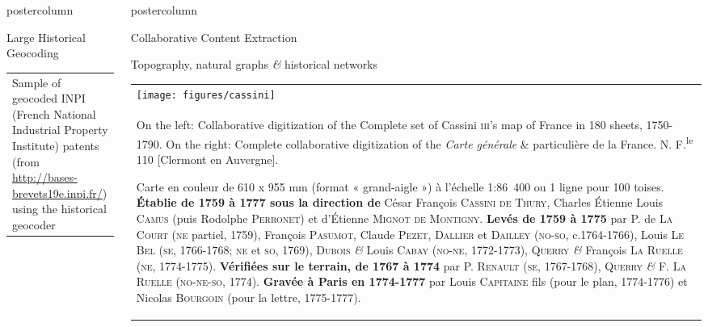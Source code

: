 \documentclass[final,hyperref={pdfpagelabels=false}]{beamer}
\let\oldcite=\cite
\renewcommand{\cite}[1]{\textcolor{ta3chameleon}{\oldcite{#1}}}
\begin{document}
\begin{frame}
\begin{columns}
\begin{column}{0.5\textwidth}
\begin{beamercolorbox}[center,wd=\textwidth]{postercolumn}
\begin{minipage}[t]{.98\textwidth}
\begin{block}{Large Historical Geocoding}
\begin{tabular}{>{\centering}m{}}
        \scriptsize Sample of geocoded INPI (French National Industrial Property Institute) patents (from \url{http://bases-brevets19e.inpi.fr/}) using the historical geocoder~\cite{Cura2018}
      \end{tabular}
    \end{block}
    \end{minipage}
    \end{beamercolorbox}
    \end{column}
    \begin{column}{0.5\textwidth}
    \begin{beamercolorbox}[center,wd=\textwidth]{postercolumn}
    \begin{minipage}[t]{.98\textwidth}
      \begin{block}{Collaborative Content Extraction}
        \centering
        \begin{flushleft}
          Topography, natural graphs \textit{\&} historical networks~\cite{Perret2015_,Perret2015Data_}
        \end{flushleft}
        \begin{tabular}{p{}}
	  \centering\texttt{[image: figures/cassini]} \\
          \scriptsize
          On the left: Collaborative digitization of the Complete set of Cassini \textsc{iii}'s map of France in 180 sheets, 1750-1790.
          On the right: Complete collaborative digitization of the \textit{Carte générale} \& particulière de la France.
          N\degree 52. F.\textsuperscript{le} 110 [Clermont en Auvergne].
          \begin{flushleft}
            \tiny{
              Carte en couleur de 610 x 955 mm (format « grand-aigle ») à l'échelle 1:86~400 ou 1 ligne pour 100 toises.
              \textbf{Établie de 1759 à 1777 sous la direction de} César François \textsc{Cassini de Thury}, Charles Étienne Louis \textsc{Camus} (puis Rodolphe \textsc{Perronet}) et d’Étienne \textsc{Mignot de Montigny}.
              \textbf{Levés de 1759 à 1775} par P. de \textsc{La Court} (\textsc{ne} partiel, 1759), François \textsc{Pasumot}, Claude \textsc{Pezet}, \textsc{Dallier} et \textsc{Dailley} (\textsc{no-so}, c.1764-1766), Louis \textsc{Le Bel} (\textsc{se}, 1766-1768; \textsc{ne} et \textsc{so}, 1769), \textsc{Dubois} \textit{\&} Louis \textsc{Cabay} (\textsc{no-ne}, 1772-1773), \textsc{Querry} \textit{\&} François \textsc{La Ruelle} (\textsc{ne}, 1774-1775).
              \textbf{Vérifiées sur le terrain, de 1767 à 1774} par P. \textsc{Renault} (\textsc{se}, 1767-1768), \textsc{Querry} \textit{\&} F. \textsc{La Ruelle} (\textsc{no-ne-so}, 1774). \textbf{Gravée à Paris en 1774-1777} par Louis \textsc{Capitaine} fils (pour le plan, 1774-1776) et Nicolas \textsc{Bourgoin} (pour la lettre, 1775-1777).
}
\end{flushleft}
\end{tabular}
\end{block}
\end{minipage}
\end{beamercolorbox}
\end{column}
\end{columns}
\end{frame}
\end{document}
